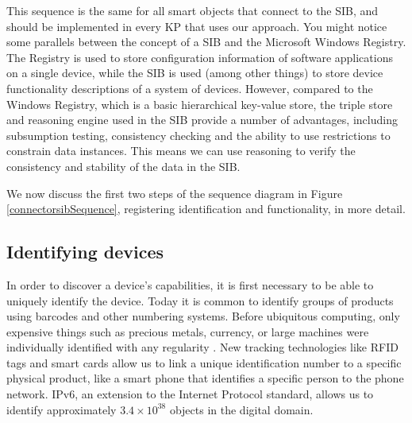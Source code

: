 This sequence is the same for all smart objects that connect to the \ac{SIB}, and should be implemented in every \ac{KP} that uses our approach. You might notice some parallels between the concept of a \ac{SIB} and the Microsoft Windows Registry. The Registry is used to store configuration information of software applications on a single device, while the \ac{SIB} is used (among other things) to store device functionality descriptions of a system of devices. However, compared to the Windows Registry, which is a basic hierarchical key-value store, the triple store and reasoning engine used in the \ac{SIB} provide a number of advantages, including subsumption testing, consistency checking and the ability to use restrictions to constrain data instances. This means we can use reasoning to verify the consistency and stability of the data in the \ac{SIB}.

We now discuss the first two steps of the sequence diagram in Figure \ref{connectorsibSequence}, registering identification and functionality, in more detail.

\subsection{Identifying devices}

In order to discover a device's capabilities, it is first necessary to be able to uniquely identify the device. Today it is common to identify groups of products using barcodes and other numbering systems. Before ubiquitous computing, only expensive things such as precious metals, currency, or large machines were individually identified with any regularity \cite{Kuniavsky}. New tracking technologies like \ac{RFID} tags and smart cards allow us to link a unique identification number to a specific physical product, like a smart phone that identifies a specific person to the phone network. IPv6, an extension to the Internet Protocol standard, allows us to identify approximately $3.4 \times 10^{38} $ objects in the digital domain.

